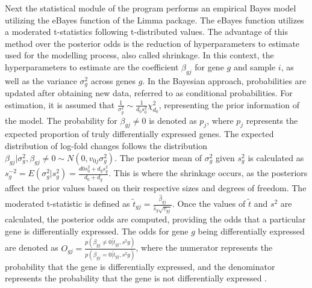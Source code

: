 \documentclass[
  11pt,
]{article}
\begin{document}
Next the statistical module of the program performs an empirical Bayes
model utilizing the eBayes \citep{Smyth2004} function of the Limma
package. The eBayes function utilizes a moderated t-statistics following
t-distributed values. The advantage of this method over the posterior
odds is the reduction of hyperparameters to estimate used for the
modelling process, also called shrinkage. In this context, the
hyperparameters to estimate are the coefficient \(\beta_{gj}\) for gene
\(g\) and sample \(i\), as well as the variance \(\sigma^2_g\) across
genes \(g\). In the Bayesian approach, probabilities are updated after
obtaining new data, referred to as conditional probabilities. For
estimation, it is assumed that
\(\frac{1}{\sigma^2_g} \sim \frac{1}{d_{0}s^2_{0}} \chi^2_{d_{0}}\),
representing the prior information of the model. The probability for
\(\beta_{gj} \neq 0\) is denoted as \(p_j\), where \(p_j\) represents
the expected proportion of truly differentially expressed genes. The
expected distribution of log-fold changes follows the distribution
\(\beta_{gj} | \sigma^2_g , \beta_{gj} \neq 0 \sim N(0, v_{0j}\sigma^2_g)\).
The posterior mean of \(\sigma^2_g\) given \(s^2_g\) is calculated as
\(s^{-2}_g = E(\sigma^2_g | s^2_g) = \frac{d{0}s^2_{0} + d_{g}s^2_{g}}{d_{0} + d_{g}}\).
This is where the shrinkage occurs, as the posteriors affect the prior
values based on their respective sizes and degrees of freedom. The
moderated t-statistic is defined as
\(\tilde{t}_{gj} = \frac{\hat{\beta}_{gj}}{\hat{s}_{g}\sqrt{v_{gj}}}\).
Once the values of \(\tilde{t}\) and \(s^{2}\) are calculated, the
posterior odds are computed, providing the odds that a particular gene
is differentially expressed. The odds for gene \(g\) being
differentially expressed are denoted as
\(O_{gj} = \frac{p(\beta_{gj} \neq 0 | \tilde{t}_{gj}, s^2{g})}{p(\beta_{gj} = 0 | \tilde{t}_{gj}, s^2{g})}\),
where the numerator represents the probability that the gene is
differentially expressed, and the denominator represents the probability
that the gene is not differentially expressed \citep{Smyth2004}.
\end{document}
